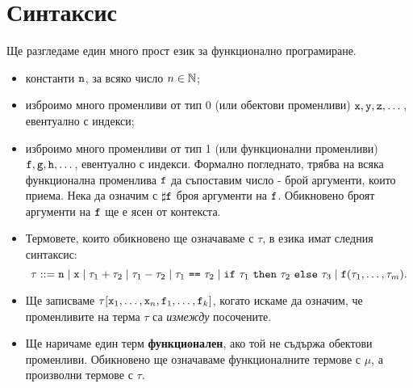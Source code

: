 \section{Синтаксис}
Ще разгледаме един много прост език за функционално програмиране.
\begin{itemize}
\item
  константи $\texttt{n}$, за всяко число $n \in \mathbb{N}$;
\item
  изброимо много променливи от тип 0 (или обектови променливи) $\texttt{x}, \texttt{y}, \texttt{z}, \dots$, евентуално с индекси;
\item
  изброимо много променливи от тип 1 (или функционални променливи) $\texttt{f},\texttt{g},\texttt{h},\dots$, евентуално с индекси. 
  Формално погледнато, трябва на всяка функционална променлива $\texttt{f}$
  да съпоставим число - брой аргументи, които приема. Нека да означим с $\sharp\texttt{f}$ броя аргументи на $\texttt{f}$.
  Обикновено броят аргументи на $\texttt{f}$ ще е ясен от контекста.
\item
  Термовете, които обикновено ще означаваме с $\tau$, в езика \FUN имат следния синтаксис:
  \[\tau ::= \texttt{n} \mid \texttt{x} \mid \tau_1 + \tau_2 \mid \tau_1 - \tau_2 \mid \tau_1\ \texttt{==}\ \tau_2 \mid \texttt{if}\ \tau_1\ \texttt{then}\ \tau_2\ \texttt{else}\ \tau_3 \mid \texttt{f}(\tau_1,\dots,\tau_m).\]
\item
  Ще записваме $\tau[\texttt{x}_1,\dots,\texttt{x}_n,\texttt{f}_1,\dots,\texttt{f}_k]$, когато искаме да означим, че променливите
  на терма $\tau$ са {\em измежду} посочените.
\item
  Ще наричаме един терм {\bf функционален}, ако той не съдържа обектови променливи.
  Обикновено ще означаваме функционалните термове с $\mu$, а произволни термове с $\tau$.

\end{itemize}
